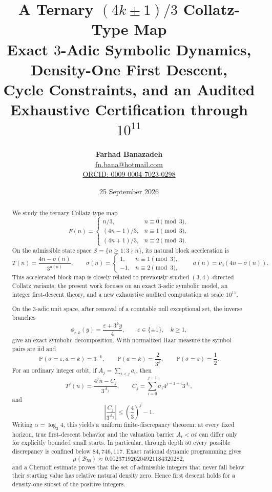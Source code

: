 \documentclass[11pt]{article}
\title{\textbf{A Ternary $(4k\pm1)/3$ Collatz-Type Map}\\[4pt]
\large Exact $3$-Adic Symbolic Dynamics, Density-One First Descent,\\
Cycle Constraints, and an Audited Exhaustive Certification through $10^{11}$}
\author{\textbf{Farhad Banazadeh}\\
\href{mailto:fn.bana@hotmail.com}{fn.bana@hotmail.com}\\
\href{https://orcid.org/0009-0004-7023-0298}{ORCID: 0009-0004-7023-0298}}
\date{25 September 2026}
\theoremstyle{definition}
\theoremstyle{remark}
\begin{document}
\maketitle



\begin{abstract}\sloppy
We study the ternary Collatz-type map
\[
F(n)=
\begin{cases}
 n/3, & n\equiv0\pmod3,\\[1mm]
 (4n-1)/3, & n\equiv1\pmod3,\\[1mm]
 (4n+1)/3, & n\equiv2\pmod3.
\end{cases}
\]
On the admissible state space
\(\mathcal S=\{n\ge1:3\nmid n\}\), its natural block acceleration is
\[
T(n)=\frac{4n-\sigma(n)}{3^{a(n)}},\qquad
\sigma(n)=\begin{cases}1,&n\equiv1\pmod3,\\-1,&n\equiv2\pmod3,\end{cases}
\qquad
a(n)=\nu_3(4n-\sigma(n)).
\]
This accelerated block map is closely related to previously studied $(3,4)$-directed Collatz variants; the present work focuses on an exact $3$-adic symbolic model, an integer first-descent theory, and a new exhaustive audited computation at scale $10^{11}$.

On the $3$-adic unit space, after removal of a countable null exceptional set, the inverse branches
\[
\phi_{\varepsilon,k}(y)=\frac{\varepsilon+3^k y}{4},
\qquad \varepsilon\in\{\pm1\},\quad k\ge1,
\]
give an exact symbolic decomposition.  With normalized Haar measure the symbol pairs are iid and
\[
\mathbb P(\sigma=\varepsilon,a=k)=3^{-k},\qquad
\mathbb P(a=k)=\frac{2}{3^k},\qquad
\mathbb P(\sigma=\varepsilon)=\frac12.
\]
For an ordinary integer orbit, if
\(A_j=\sum_{i<j}a_i\), then
\[
T^j(n)=\frac{4^j n-C_j}{3^{A_j}},\qquad
C_j=\sum_{i=0}^{j-1}\sigma_i4^{j-1-i}3^{A_i},
\]
and
\[
\left|\frac{C_j}{3^{A_j}}\right|\le\left(\frac43\right)^j-1.
\]
Writing \(\alpha=\log_3 4\), this yields a uniform finite-discrepancy theorem: at every fixed horizon, true first-descent behavior and the valuation barrier \(A_t<\alpha t\) can differ only for explicitly bounded small starts.  In particular, through depth $50$ every possible discrepancy is confined below $84{,}746{,}117$.  Exact rational dynamic programming gives
\[
\mu(\mathcal B_{50})\approx0.002371926204921184320282,
\]
and a Chernoff estimate proves that the set of admissible integers that never fall below their starting value has relative natural density zero.  Hence first descent holds for a density-one subset of the positive integers.


\end{abstract}
\end{document}

